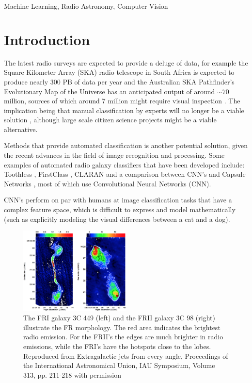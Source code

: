 \documentclass[conference]{IEEEtran}
\begin{document}
\begin{IEEEkeywords}
Machine Learning, Radio Astronomy, Computer Vision 
\end{IEEEkeywords}

\section{Introduction}
The latest radio surveys are expected to provide a deluge of data, for example the Square Kilometer Array (SKA) radio telescope in South Africa is expected to produce nearly 300 PB of data per year \cite{jonas_2018} and the Australian SKA Pathfinder's Evolutionary Map of the Universe has an anticipated output of around $\sim70$ million, sources of which around 7 million might require visual inspection \cite{askap_2008} \cite{emu_2011}. The implication being that  manual classification by experts will no longer be a viable solution \cite{hocking_2015}, although large scale citizen science projects might be a viable alternative.

Methods that provide automated classification is another potential solution, given the recent advances in the field of image recognition and processing. Some examples of automated radio galaxy classifiers that have been developed include: Toothless \cite{aniyan_thorat_2017}, FirstClass \cite{alhassan_2018}, CLARAN \cite{wu_2019} and a comparison between CNN's and Capsule Networks \cite{lukic_2019}, most of which use Convolutional Neural Networks (CNN).

CNN's perform on par with humans at image classification tasks that have a complex feature space, which is difficult to express and model mathematically (such as explicitly modeling the visual differences between a cat and a dog). 


\begin{figure}[h]
    \centering
    \includegraphics[width=0.5\textwidth]{EPS/kharb2015.eps}
    \caption{The FRI galaxy 3C 449 (left) and the FRII galaxy 3C 98 (right) illustrate the FR morphology. The red area indicates the brightest radio emission. For the FRII's the edges are much brighter in radio emissions, while the FRI's have the hotspots close to the lobes. Reproduced from Extragalactic jets from every angle, Proceedings of the International Astronomical Union, IAU Symposium, Volume 313, pp. 211-218 with permission \cite{kharb2015}}
    \label{fig:kharb}
\end{figure}
\end{document}
